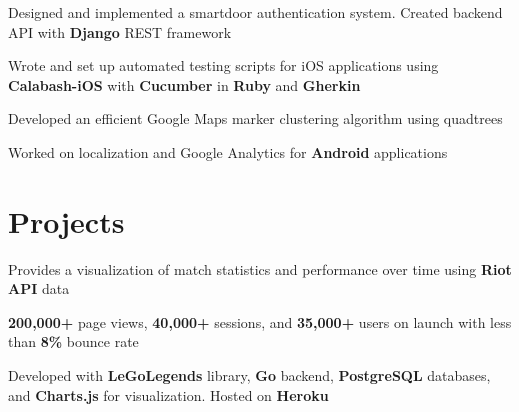 \documentclass[]{peter_resume}
\begin{document}
\begin{minipage}{\textwidth}
\begin{tightemize}
\item Designed and implemented a smartdoor authentication system. Created backend API with \textbf{Django} REST framework
\item Wrote and set up automated testing scripts for iOS applications using \textbf{Calabash-iOS} with \textbf{Cucumber} in \textbf{Ruby} and \textbf{Gherkin}
\item Developed an efficient Google Maps marker clustering algorithm using quadtrees
\item Worked on localization and Google Analytics for \textbf{Android} applications
\end{tightemize}
\sectionsep


\begin{comment}
\runsubsection{Imagine Communications}
\descript{\hfill Application Developer}
\location{May 2014 – Aug 2014 | Waterloo, ON}
\begin{tightemize}
\item Developed an internal progress dashboard to record and monitor employee efficiency using \textbf{AngularJS} and \textbf{Bootstrap}
\item Worked on a \textbf{C\#} API for the progress dashboard
\item Maintained existing software systems by fixing bugs in the Silverlight frontend and \textbf{C\#} backend
\end{tightemize}
\sectionsep
\end{comment}


\section{Projects}

\begin{tightemize}
\item Provides a visualization of match statistics and performance over time using \textbf{Riot API} data
\item \textbf{200,000+} page views, \textbf{40,000+} sessions, and \textbf{35,000+} users on launch with less than \textbf{8\%} bounce rate
\item Developed with \textbf{LeGoLegends} library, \textbf{Go} backend, \textbf{PostgreSQL} databases, and \textbf{Charts.js} for visualization. Hosted on \textbf{Heroku}
\end{tightemize} 
\sectionsep


\end{minipage}
\end{document}
